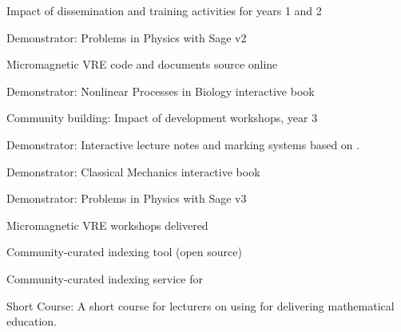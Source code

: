 \begin{workpackage}
\begin{wpdelivs}
  \begin{wpdeliv}[due=24,id=dissem-1,dissem=PU,nature=R,lead=PS]{Impact of dissemination and training activities for years 1 and 2}\end{wpdeliv}  
   \begin{wpdeliv}[due=30,id=ibook3b,dissem=PU,nature=DEM,lead=US]{Demonstrator: Problems in Physics with Sage v2} \end{wpdeliv}
   \begin{wpdeliv}[due=32,id=oommfnb-source-and-testing-setup,dissem=PU,nature=DEC,lead=USO]{Micromagnetic
     VRE code and documents source online} \end{wpdeliv}
 \begin{wpdeliv}[due=36,id=ibook1,dissem=PU,nature=DEM,lead=US]{Demonstrator: Nonlinear Processes in Biology  interactive book} \end{wpdeliv}
 \begin{wpdeliv}[due=36,id=workshops-3,dissem=PU,nature=R,lead=PS]{Community building: Impact of development workshops, year 3}\end{wpdeliv}
  \begin{wpdeliv}[due=36,id=lecture-notes,dissem=PU,nature=DEM,lead=USH]{Demonstrator: Interactive lecture notes and marking systems based on \TheProject.}\end{wpdeliv}
 \begin{wpdeliv}[due=40,id=ibook2,dissem=PU,nature=DEM,lead=US]{Demonstrator: Classical Mechanics interactive book} \end{wpdeliv}
 \begin{wpdeliv}[due=44,id=ibook3c,dissem=PU,nature=DEM,lead=US]{Demonstrator: Problems in Physics with Sage v3} \end{wpdeliv}
 \begin{wpdeliv}[due=44,id=oommfnb-workshops,dissem=PU,nature=OTHER,lead=USO]{Micromagnetic
     VRE workshops delivered} \end{wpdeliv}
 \begin{wpdeliv}[due=24,id=ils-tool,dissem=PU,nature=P,lead=UV]{Community-curated
     indexing tool (open source)} \end{wpdeliv}
 \begin{wpdeliv}[due=24,id=ils-service,dissem=PU,nature=DEM,lead=UV]{Community-curated
     indexing service for \TheProject} \end{wpdeliv}
 \begin{wpdeliv}[due=18,id=short-course,dissem=PU,nature=DEC,lead=USH]{Short Course: A short course for lecturers on using \TheProject for delivering mathematical education.}\end{wpdeliv}

\end{wpdelivs}
\end{workpackage}
